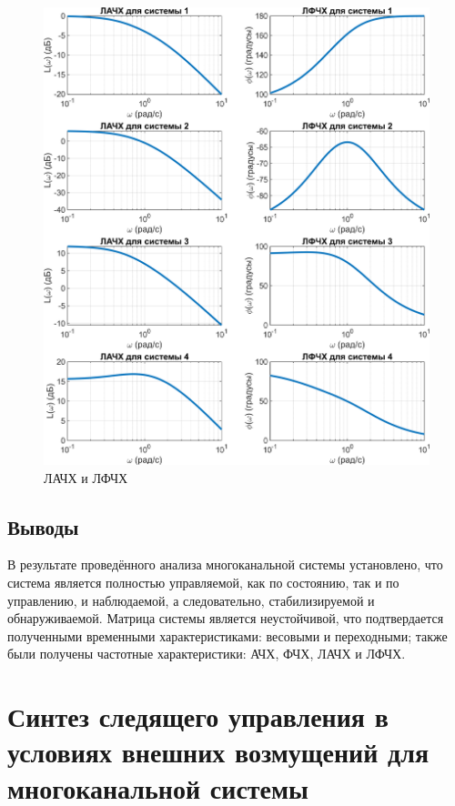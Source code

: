 \begin{figure}[H]
    \centering
    \includegraphics[width=\linewidth]{figs/combined_L_P_logfreq.png}
    \caption{ЛАЧХ и ЛФЧХ}
    \label{fig:1_logfreq}
\end{figure}

\subsection{Выводы}

В результате проведённого анализа многоканальной системы установлено, 
что система является полностью управляемой, как по состоянию, так и по управлению, 
и наблюдаемой, а следовательно, стабилизируемой и обнаруживаемой. Матрица системы
является неустойчивой, что подтвердается полученными временными характеристиками: 
весовыми и переходными; также были получены 
частотные характеристики: АЧХ, ФЧХ, ЛАЧХ и ЛФЧХ. 


\section{Синтез следящего управления в условиях внешних 
возмущений для многоканальной системы}
